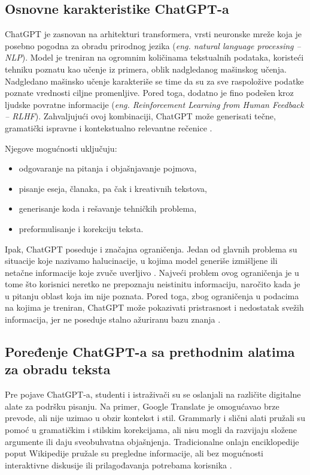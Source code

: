 \documentclass[12pt]{article}
\begin{document}
\subsection{Osnovne karakteristike ChatGPT-a}
ChatGPT je zasnovan na arhitekturi transformera, vrsti neuronske mreže koja je posebno pogodna za obradu prirodnog jezika (\textit{eng. natural language processing – NLP}). Model je treniran na ogromnim količinama tekstualnih podataka, koristeći tehniku poznatu kao učenje iz primera, oblik nadgledanog mašinskog učenja. Nadgledano mašinsko učenje karakteriše se time da su za sve raspoložive podatke poznate vrednosti ciljne promenljive. Pored toga, dodatno je fino podešen kroz ljudske povratne informacije (\textit{eng. Reinforcement Learning from Human Feedback – RLHF}). Zahvaljujući ovoj kombinaciji, ChatGPT može generisati tečne, gramatički ispravne i kontekstualno relevantne rečenice \cite{montenegro2023impact}. 
\vspace{6px}

Njegove mogućnosti uključuju:
\begin{itemize}
    \item odgovaranje na pitanja i objašnjavanje pojmova, 
    \item pisanje eseja, članaka, pa čak i kreativnih tekstova, 
    \item generisanje koda i rešavanje tehničkih problema, 
    \item preformulisanje i korekciju teksta.
\end{itemize}

\vspace{6px}
Ipak, ChatGPT poseduje i značajna ograničenja. Jedan od glavnih problema su situacije koje nazivamo halucinacije, u kojima model generiše izmišljene ili netačne informacije koje zvuče uverljivo \cite{edwards2023chatgpt}. Najveći problem ovog ograničenja je u tome što korisnici neretko ne prepoznaju neistinitu informaciju, naročito kada je u pitanju oblast koja im nije poznata. Pored toga, zbog ograničenja u podacima na kojima je treniran, ChatGPT može pokazivati pristrasnost i nedostatak svežih informacija, jer ne poseduje stalno ažuriranu bazu znanja \cite{xu2025patterns}. 

\subsection{Poređenje ChatGPT-a sa prethodnim alatima za obradu teksta}

Pre pojave ChatGPT-a, studenti i istraživači su se oslanjali na različite digitalne alate za podršku pisanju. Na primer, Google Translate \cite{googletranslate} je omogućavao brze prevode, ali nije uzimao u obzir kontekst i stil. Grammarly \cite{grammarly} i slični alati pružali su pomoć u gramatičkim i stilskim korekcijama, ali nisu mogli da razvijaju složene argumente ili daju sveobuhvatna objašnjenja. Tradicionalne onlajn enciklopedije poput Wikipedije pružale su pregledne informacije, ali bez mogućnosti interaktivne diskusije ili prilagođavanja potrebama korisnika \cite{zakova2025exploring}.
\end{document}
